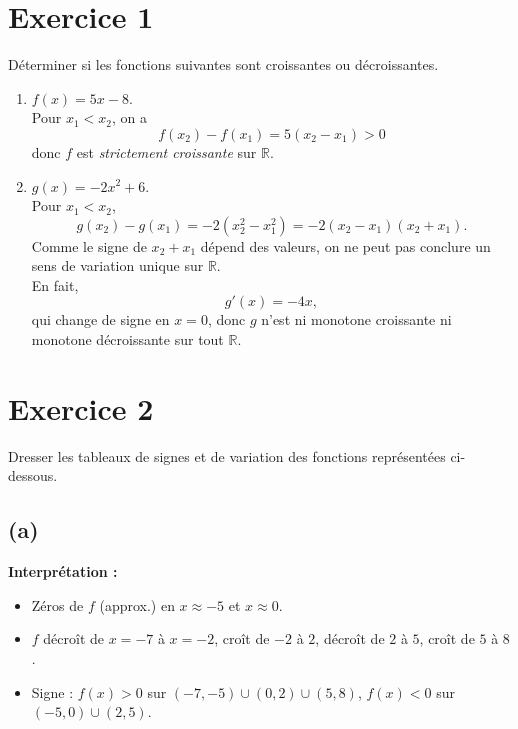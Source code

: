 \documentclass{article}
\theoremstyle{definition}
\begin{document}
\begin{center}
\end{center}

\newpage
\section*{Exercice 1}
Déterminer si les fonctions suivantes sont croissantes ou décroissantes.
\begin{enumerate}
  \item $f(x)=5x-8$.\\
    Pour $x_1<x_2$, on a
    \[
      f(x_2)-f(x_1)=5(x_2-x_1)>0
    \]
    donc $f$ est \emph{strictement croissante} sur $\mathbb{R}$.
  \item $g(x)=-2x^2+6$.\\
    Pour $x_1<x_2$,
    \[
      g(x_2)-g(x_1)
      =-2(x_2^2-x_1^2)
      =-2(x_2-x_1)(x_2+x_1).
    \]
    Comme le signe de $x_2+x_1$ dépend des valeurs, on ne peut pas conclure un sens de variation unique sur $\mathbb{R}$.\\
    En fait,
    \[
      g'(x)=-4x,
    \]
    qui change de signe en $x=0$, donc $g$ n'est ni monotone croissante ni monotone décroissante sur tout $\mathbb{R}$.
\end{enumerate}

\section*{Exercice 2}
Dresser les tableaux de signes et de variation des fonctions représentées ci-dessous.

\subsection*{(a)}

\noindent\textbf{Interprétation :}
\begin{itemize}
  \item Zéros de $f$ (approx.) en $x\approx -5$ et $x\approx 0$.
  \item $f$ décroît de $x=-7$ à $x=-2$, croît de $-2$ à $2$, décroît de $2$ à $5$, croît de $5$ à $8$.
  \item Signe : $f(x)>0$ sur $(-7,-5)\cup(0,2)\cup(5,8)$, $f(x)<0$ sur $(-5,0)\cup(2,5)$.
\end{itemize}
\end{document}
